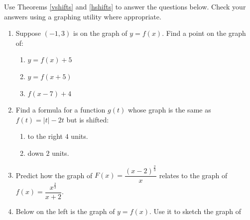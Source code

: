  \begin{ex} \label{shiftex}  Use Theorems  \ref{vshifts} and \ref{hshifts} to answer the questions below.  Check your answers using a graphing utility where appropriate.
 
 \begin{enumerate}
 
 \item  Suppose $(-1,3)$ is on the graph of $y = f(x)$.  Find a point on the graph of:
 
 \begin{multicols}{3}
 
 \begin{enumerate}
 
 \item $y = f(x)+5$
 
 \item $y = f(x+5)$
 
 \item  $f(x-7)+4$
 
 \end{enumerate}
 
 \end{multicols}
 
 \item  Find a formula for a function $g(t)$ whose graph is the same as $f(t) = |t|-2t$ but is shifted:
 
 \begin{multicols}{2}
 
 \begin{enumerate}
 
 \item to the right $4$ units.
 
 \item down $2$ units.
 
 \end{enumerate}
 
 \end{multicols}
 
 \item Predict how the graph of $F(x) = \dfrac{(x-2)^{\frac{2}{3}}}{x}$ relates to the graph of $f(x) = \dfrac{x^{\frac{2}{3}}}{x+2}$. 
 
\item  Below on the left is the graph of $y = f(x)$.  Use it to sketch the graph of

  \begin{multicols}{3}
 
 \begin{enumerate}
 

\end{enumerate}
\end{multicols}
\end{enumerate}
\end{ex}
